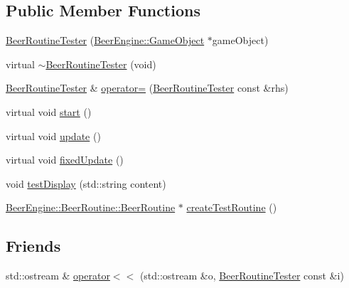 \subsection*{Public Member Functions}
\begin{DoxyCompactItemize}
\item 
\mbox{\hyperlink{class_game_1_1_component_1_1_beer_routine_tester_abcb7ea4145e8ef864f969c8503b0dabf}{Beer\+Routine\+Tester}} (\mbox{\hyperlink{class_beer_engine_1_1_game_object}{Beer\+Engine\+::\+Game\+Object}} $\ast$game\+Object)
\item 
virtual \mbox{\hyperlink{class_game_1_1_component_1_1_beer_routine_tester_a8be9160f8eb51946c517df27b6066fc4}{$\sim$\+Beer\+Routine\+Tester}} (void)
\item 
\mbox{\hyperlink{class_game_1_1_component_1_1_beer_routine_tester}{Beer\+Routine\+Tester}} \& \mbox{\hyperlink{class_game_1_1_component_1_1_beer_routine_tester_a9f75598140bb2e11d0d89d5b8a80f30e}{operator=}} (\mbox{\hyperlink{class_game_1_1_component_1_1_beer_routine_tester}{Beer\+Routine\+Tester}} const \&rhs)
\item 
virtual void \mbox{\hyperlink{class_game_1_1_component_1_1_beer_routine_tester_a7c721d466c33fd0a34e65707f55272a2}{start}} ()
\item 
virtual void \mbox{\hyperlink{class_game_1_1_component_1_1_beer_routine_tester_a2f14ce6211722f92a8ec5886dbeabd6c}{update}} ()
\item 
virtual void \mbox{\hyperlink{class_game_1_1_component_1_1_beer_routine_tester_a01abf9a71d6c3598a3c9a8c0d26c1615}{fixed\+Update}} ()
\item 
void \mbox{\hyperlink{class_game_1_1_component_1_1_beer_routine_tester_a08fca7a8e15f6e207f14e9ae2b984d62}{test\+Display}} (std\+::string content)
\item 
\mbox{\hyperlink{class_beer_engine_1_1_beer_routine_1_1_beer_routine}{Beer\+Engine\+::\+Beer\+Routine\+::\+Beer\+Routine}} $\ast$ \mbox{\hyperlink{class_game_1_1_component_1_1_beer_routine_tester_ad3edfa2389d65a4e11514695e9187a74}{create\+Test\+Routine}} ()
\end{DoxyCompactItemize}
\subsection*{Friends}
\begin{DoxyCompactItemize}
\item 
std\+::ostream \& \mbox{\hyperlink{class_game_1_1_component_1_1_beer_routine_tester_ada4aa4bf7052377c97401aad042659d2}{operator$<$$<$}} (std\+::ostream \&o, \mbox{\hyperlink{class_game_1_1_component_1_1_beer_routine_tester}{Beer\+Routine\+Tester}} const \&i)
\end{DoxyCompactItemize}
